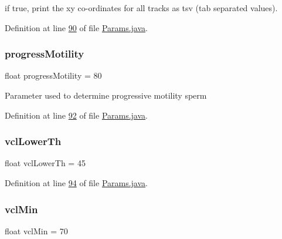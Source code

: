if true, print the xy co-\/ordinates for all tracks as tsv (tab separated values). 

Definition at line \hyperlink{_params_8java_source_l00090}{90} of file \hyperlink{_params_8java_source}{Params.\+java}.

\hypertarget{classdata_1_1_params_ae9dd6b8ec81f8ae0b40a4e8e2d9cdc06}{}\label{classdata_1_1_params_ae9dd6b8ec81f8ae0b40a4e8e2d9cdc06} 
\subsubsection{\texorpdfstring{progress\+Motility}{progressMotility}}
{\footnotesize\ttfamily float progress\+Motility = 80\hspace{0.3cm}{\ttfamily [static]}}

Parameter used to determine progressive motility sperm 

Definition at line \hyperlink{_params_8java_source_l00092}{92} of file \hyperlink{_params_8java_source}{Params.\+java}.

\hypertarget{classdata_1_1_params_af9a2118a2e00978d900279677c64bbeb}{}\label{classdata_1_1_params_af9a2118a2e00978d900279677c64bbeb} 
\subsubsection{\texorpdfstring{vcl\+Lower\+Th}{vclLowerTh}}
{\footnotesize\ttfamily float vcl\+Lower\+Th = 45\hspace{0.3cm}{\ttfamily [static]}}



Definition at line \hyperlink{_params_8java_source_l00094}{94} of file \hyperlink{_params_8java_source}{Params.\+java}.

\hypertarget{classdata_1_1_params_af4cb43f0bfe24c14e75780187235376c}{}\label{classdata_1_1_params_af4cb43f0bfe24c14e75780187235376c} 
\subsubsection{\texorpdfstring{vcl\+Min}{vclMin}}
{\footnotesize\ttfamily float vcl\+Min = 70\hspace{0.3cm}{\ttfamily [static]}}

